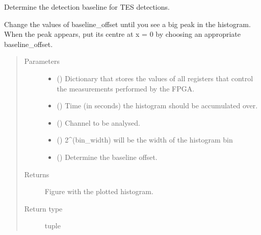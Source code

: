 \documentclass[letterpaper,10pt,english]{sphinxmanual}
\begin{document}

\begin{fulllineitems}
\label{\detokenize{tes:tes.mca_control.baseline_offset}}
\sphinxAtStartPar
Determine the detection baseline for TES detections.

\sphinxAtStartPar
Change the values of baseline\_offset until you see a big peak
in the  histogram. When the peak appears, put its centre at
x = 0 by choosing an  appropriate baseline\_offset.
\begin{quote}\begin{description}
\item[{Parameters}] \leavevmode\begin{itemize}
\item {} 
\sphinxAtStartPar
{} () \textendash{} Dictionary that stores the values of all registers that
control the measurements performed by the FPGA.

\item {} 
\sphinxAtStartPar
{} () \textendash{} Time (in seconds) the histogram should be accumulated over.

\item {} 
\sphinxAtStartPar
{} () \textendash{} Channel to be analysed.

\item {} 
\sphinxAtStartPar
{} () \textendash{} 2\textasciicircum{}(bin\_width) will be the width of the histogram bin

\item {} 
\sphinxAtStartPar
{} () \textendash{} Determine the baseline offset.

\end{itemize}

\item[{Returns}] \leavevmode
\sphinxAtStartPar
{} \textendash{} Figure with the plotted histogram.

\item[{Return type}] \leavevmode
\sphinxAtStartPar
tuple

\end{description}\end{quote}

\end{fulllineitems}
\end{document}
